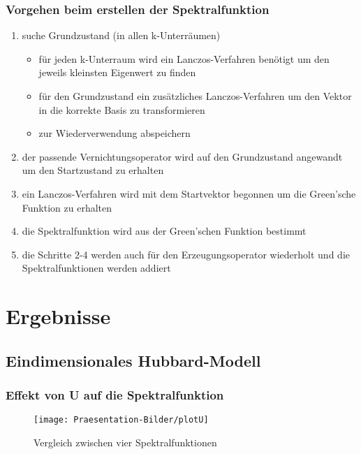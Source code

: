 \documentclass{beamer}
\begin{document}
\begin{frame}
\frametitle{Vorgehen beim erstellen der Spektralfunktion}
\begin{enumerate}
\item suche Grundzustand (in allen k-Unterräumen)
\begin{itemize}
	\item für jeden k-Unterraum wird ein Lanczos-Verfahren benötigt um den jeweils kleinsten Eigenwert zu finden
	\item für den Grundzustand ein zusätzliches Lanczos-Verfahren um den Vektor in die korrekte Basis zu transformieren\pause
	\item zur Wiederverwendung abspeichern\pause
\end{itemize}
\item der passende Vernichtungsoperator wird auf den Grundzustand angewandt um den Startzustand zu erhalten\pause
\item ein Lanczos-Verfahren wird mit dem Startvektor begonnen um die Green'sche Funktion zu erhalten\pause
\item die Spektralfunktion wird aus der Green'schen Funktion bestimmt\pause
\item die Schritte 2-4 werden auch für den Erzeugungsoperator wiederholt und die Spektralfunktionen werden addiert
\end{enumerate}
\end{frame}

\section{Ergebnisse}
\subsection{Eindimensionales Hubbard-Modell}
%

\begin{frame}
\frametitle{Effekt von U auf die Spektralfunktion}
\begin{figure}
	\centering
	\texttt{[image: Praesentation-Bilder/plotU]}
	\caption{Vergleich zwischen vier Spektralfunktionen}
	\label{fig:l10u1vs5}
\end{figure}

\end{frame}
\end{document}
